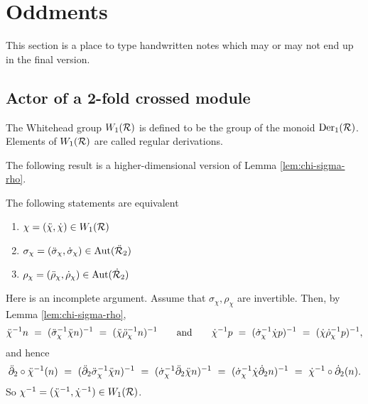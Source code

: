 
\section{Oddments}

This section is a place to type handwritten notes which may or may not 
end up in the final version.


\subsection{Actor of a 2-fold crossed module} \label{subs:actor-xxmod}

\begin{defn}   
The Whitehead group $W_1(\mathcal{R})$ is defined to be the group of the monoid 
$\mathrm{Der}_1(\mathcal{R})$. 
Elements of $W_1(\mathcal{R})$ are called regular derivations.
\end{defn}

\noindent
The following result is a higher-dimensional version of
Lemma \ref{lem:chi-sigma-rho}.

\begin{lem} \label{lem:equiv-w1s}
The following statements are equivalent 
\begin{enumerate}[\rm (a)]
\item $\chi = (\ddot{\chi}, \dot{\chi}) \in W_1(\mathcal{R}) $
\item $\sigma_{\chi} = (\ddot{\sigma}_{\chi}, \dot{\sigma}_{\chi})  \in \mathrm{Aut}(\ddot{\mathcal{R}}_2)$
\item $ \rho_{\chi} = (\ddot{\rho}_{\chi}, \dot{\rho}_{\chi})  \in \mathrm{Aut}(\dot{\mathcal{R}}_2)$
\end{enumerate}
\end{lem}
\begin{pf}
Here is an incomplete argument.
Assume that $\sigma_{\chi}, \rho_{\chi}$ are invertible.
Then, by Lemma \ref{lem:chi-sigma-rho}, 
$$
\ddot{\chi}^{-1}n ~=~ (\ddot{\sigma}_{\chi}^{-1}\ddot{\chi} n)^{-1} 
            ~=~ (\ddot{\chi}\ddot{\rho}_{\chi}^{-1} n)^{-1}
\qquad\mbox{and}\qquad
\dot{\chi}^{-1}p ~=~ (\dot{\sigma}_{\chi}^{-1}\dot{\chi} p)^{-1} 
           ~=~ (\dot{\chi}\dot{\rho}_{\chi}^{-1} p)^{-1},
$$
and hence
$$
\ddot{\partial}_2 \circ \ddot{\chi}^{-1} (n)
~=~ (\ddot{\partial}_2 \ddot{\sigma}_{\chi}^{-1} \ddot{\chi} n)^{-1}
~=~ (\dot{\sigma}_{\chi}^{-1} \ddot{\partial}_2 \ddot{\chi} n)^{-1}
~=~ (\dot{\sigma}_{\chi}^{-1} \dot{\chi} \dot{\partial}_2 n)^{-1}
~=~ \dot{\chi}^{-1} \circ \dot{\partial}_2 (n).
$$
So $\chi^{-1} = (\ddot{\chi}^{-1},\dot{\chi}^{-1}) \in W_1(\mathcal{R})$.
\end{pf}

